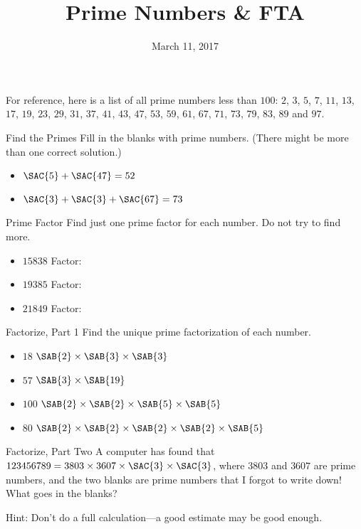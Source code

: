 \documentclass[12pt,letterpaper]{article}
\title{Prime Numbers \& FTA}
\date{March 11, 2017}
\begin{document}
\maketitle

\thispagestyle{empty}

For reference, here is a list of all prime numbers less than $100$: $2$, $3$,
$5$, $7$, $11$, $13$, $17$, $19$, $23$, $29$, $31$, $37$, $41$, $43$, $47$,
$53$, $59$, $61$, $67$, $71$, $73$, $79$, $83$, $89$ and $97$.

\begin{problem}{Find the Primes}
 Fill in the blanks with prime numbers. (There might be more than one correct
 solution.)

 \begin{itemize}
  \item \(\SAC{5} + \SAC{47} = 52\)
  \item \(\SAC{3} + \SAC{3} + \SAC{67} = 73\)
 \end{itemize}
\end{problem}

\begin{problem}{Prime Factor}
 Find just one prime factor for each number. Do not try to find more.

 \begin{itemize}
  \item $15838$ \hfill Factor: 
  \item $19385$ \hfill Factor: 
  \item $21849$ \hfill Factor: 
 \end{itemize}
\end{problem}

\begin{problem}{Factorize, Part 1}
 Find the unique prime factorization of each number.

 \begin{itemize}
  \item $18$ \hfill $\SAB{2} \times \SAB{3} \times \SAB{3}$
  \item $57$ \hfill $\SAB{3} \times \SAB{19}$
  \item $100$ \hfill $\SAB{2} \times \SAB{2} \times \SAB{5} \times \SAB{5}$
  \item $80$ \hfill $\SAB{2} \times \SAB{2} \times \SAB{2} \times \SAB{2}
  \times \SAB{5}$
 \end{itemize}
\end{problem}

\begin{problem}{Factorize, Part Two}
  A computer has found that \(123456789 = 3803 \times 3607 \times \SAC{3}
  \times \SAC{3}\), where \(3803\) and \(3607\) are prime numbers, and the two
  blanks are prime numbers that I forgot to write down! What goes in the
  blanks?

  Hint: Don't do a full calculation---a good estimate may be good enough.
\end{problem}
\end{document}
